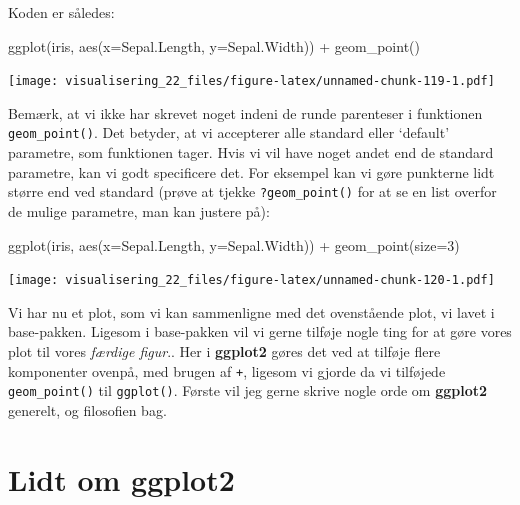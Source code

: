 \documentclass[
]{book}
\newenvironment{Shaded}{\begin{snugshade}}{\end{snugshade}}
\newcommand{\AttributeTok}[1]{\textcolor[rgb]{0.77,0.63,0.00}{#1}}
\newcommand{\DecValTok}[1]{\textcolor[rgb]{0.00,0.00,0.81}{#1}}
\newcommand{\FunctionTok}[1]{\textcolor[rgb]{0.00,0.00,0.00}{#1}}
\newcommand{\NormalTok}[1]{#1}
\newcommand{\SpecialCharTok}[1]{\textcolor[rgb]{0.00,0.00,0.00}{#1}}
\begin{document}
Koden er således:

\begin{Shaded}
\begin{Highlighting}[]
\FunctionTok{ggplot}\NormalTok{(iris, }\FunctionTok{aes}\NormalTok{(}\AttributeTok{x=}\NormalTok{Sepal.Length, }\AttributeTok{y=}\NormalTok{Sepal.Width)) }\SpecialCharTok{+}
  \FunctionTok{geom\_point}\NormalTok{()}
\end{Highlighting}
\end{Shaded}

\texttt{[image: visualisering\_22\_files/figure-latex/unnamed-chunk-119-1.pdf]}

Bemærk, at vi ikke har skrevet noget indeni de runde parenteser i funktionen \texttt{geom\_point()}. Det betyder, at vi accepterer alle standard eller `default' parametre, som funktionen tager. Hvis vi vil have noget andet end de standard parametre, kan vi godt specificere det. For eksempel kan vi gøre punkterne lidt større end ved standard (prøve at tjekke \texttt{?geom\_point()} for at se en list overfor de mulige parametre, man kan justere på):

\begin{Shaded}
\begin{Highlighting}[]
\FunctionTok{ggplot}\NormalTok{(iris, }\FunctionTok{aes}\NormalTok{(}\AttributeTok{x=}\NormalTok{Sepal.Length, }\AttributeTok{y=}\NormalTok{Sepal.Width)) }\SpecialCharTok{+}
  \FunctionTok{geom\_point}\NormalTok{(}\AttributeTok{size=}\DecValTok{3}\NormalTok{)}
\end{Highlighting}
\end{Shaded}

\texttt{[image: visualisering\_22\_files/figure-latex/unnamed-chunk-120-1.pdf]}

Vi har nu et plot, som vi kan sammenligne med det ovenstående plot, vi lavet i base-pakken. Ligesom i base-pakken vil vi gerne tilføje nogle ting for at gøre vores plot til vores \emph{færdige figur}.. Her i \textbf{ggplot2} gøres det ved at tilføje flere komponenter ovenpå, med brugen af \texttt{+}, ligesom vi gjorde da vi tilføjede \texttt{geom\_point()} til \texttt{ggplot()}. Første vil jeg gerne skrive nogle orde om \textbf{ggplot2} generelt, og filosofien bag.

\hypertarget{lidt-om-ggplot2}{%
\section{Lidt om ggplot2}\label{lidt-om-ggplot2}}
\end{document}
